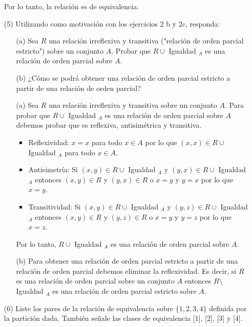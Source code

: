 \documentclass[10pt]{article}
\begin{document}
\begin{enumerate}
\begin{sol}
\begin{itemize}
        \end{itemize}
        Por lo tanto, la relación es de equivalencia.
    \end{sol}
    \item[(5)] Utilizando como motivación con los ejercicios 2 b y 2c, responda: 
    \begin{itemize}
        \item[(a)] Sea $R$ una relación irreflexiva y transitiva ("relación de orden parcial estricto") sobre un conjunto $A$. Probar que $R \cup$ Igualdad $_{A}$ es una relación de orden parcial sobre $A$.
        \item[(b)] ¿Cómo se podrá obtener una relación de orden parcial estricto a partir de una relación de orden parcial?
    \end{itemize}
    \begin{sol}
        \begin{itemize}
            \item[(a)] Sea $R$ una relación irreflexiva y transitiva sobre un conjunto $A$. Para probar que $R \cup$ Igualdad $_{A}$ es una relación de orden parcial sobre $A$ debemos probar que es reflexiva, antisimétrica y transitiva.
            \begin{itemize}
                \item Reflexividad: $x=x$ para todo $x \in A$ por lo que $(x, x) \in R \cup$ Igualdad $_{A}$ para todo $x \in A$.
                \item Antisimetría: Si $(x, y) \in R \cup$ Igualdad $_{A}$ y $(y, x) \in R \cup$ Igualdad $_{A}$ entonces $(x, y) \in R$ y $(y, x) \in R$ o $x=y$ y $y=x$ por lo que $x=y$.
                \item Transitividad: Si $(x, y) \in R \cup$ Igualdad $_{A}$ y $(y, z) \in R \cup$ Igualdad $_{A}$ entonces $(x, y) \in R$ y $(y, z) \in R$ o $x=y$ y $y=z$ por lo que $x=z$.
            \end{itemize}
            Por lo tanto, $R \cup$ Igualdad $_{A}$ es una relación de orden parcial sobre $A$.
            \item[(b)] Para obtener una relación de orden parcial estricto a partir de una relación de orden parcial debemos eliminar la reflexividad. Es decir, si $R$ es una relación de orden parcial sobre un conjunto $A$ entonces $R \setminus$ Igualdad $_{A}$ es una relación de orden parcial estricto sobre $A$.
        \end{itemize}
    \end{sol}
    \item[(6)] Liste los pares de la relación de equivalencia sobre $\{1, 2, 3, 4\}$ definida por la partición dada. También señale las clases de equivalencia [1], [2], [3] y [4].

\end{enumerate}
\end{document}
